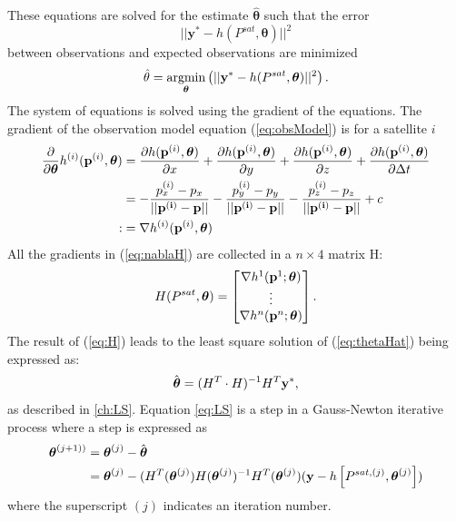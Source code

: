 These equations are solved for the estimate $\hat{\boldsymbol \theta}$ such that the error
\begin{equation}
||\textbf{y}^*-h(P^{sat},{\boldsymbol \theta})||^2
\end{equation} 
between observations and expected observations are minimized
\begin{align}\label{eq:thetaHat}
\hat{\bf \theta}=\operatorname*{argmin}_{\boldsymbol \theta}\left(||{\bf y}^*-h(P^{sat},{\boldsymbol \theta})||^2\right).
\end{align}
The system of equations is solved using the gradient of the equations. The gradient of the observation model equation (\ref{eq:obsModel}) is for a satellite $i$ 
\begin{align}
\frac{\partial}{\partial {\boldsymbol \theta}}h^{(i)}({\bf p}^{(i)},{\boldsymbol \theta})	&=
\frac{\partial h({\bf p}^{(i)},{\boldsymbol \theta})}{\partial x}+\frac{\partial h({\bf p}^{(i)},{\boldsymbol \theta})}{\partial y}+ \frac{\partial h({\bf p}^{(i)},{\boldsymbol \theta})}{\partial z}+\frac{\partial h({\bf p}^{(i)},{\boldsymbol \theta})}{\partial \Delta t} \nonumber \\
						&=-\frac{p^{(i)}_x-p_x}{||\bf p^{(i)}-p||}-\frac{p^{(i)}_y-p_y}{||\bf p^{(i)}-p||}-\frac{p^{(i)}_z-p_z}{||\bf p^{(i)}-p||}+c \nonumber \\
						:&=\nabla h^{(i)}({\bf p}^{(i)},{\boldsymbol \theta})\label{eq:nablaH}
\end{align}
All the gradients in (\ref{eq:nablaH}) are collected in a $n\times 4$ matrix H:
\begin{align}\label{eq:H}
H(P^{sat},{\boldsymbol \theta})=\begin{bmatrix}
\nabla h^1({\bf p}^{1};{\boldsymbol \theta}) \\
\vdots \\
\nabla h^n({\bf p}^{n};{\boldsymbol \theta})
\end{bmatrix}.
\end{align}
The result of (\ref{eq:H}) leads to the least square solution of (\ref{eq:thetaHat}) being expressed as:
\begin{align}\label{eq:LS}
\hat{{\boldsymbol \theta}}=(H^T\cdot H)^{-1}H^T{\bf y}^*,
\end{align}
as described in \ref{ch:LS}. Equation \ref{eq:LS} is a step in a Gauss-Newton iterative process where a step is expressed as 
\begin{align*}
{\boldsymbol \theta}^{(j+1))}	& =
{\boldsymbol \theta}^{(j)}-\hat{{\boldsymbol \theta}}\\
				& =
{\boldsymbol \theta}^{(j)}-(H^T({\boldsymbol \theta}^{(j)})H({\boldsymbol \theta}^{(j)})^{-1}H^T({\boldsymbol \theta}^{(j)})({\bf y}- h\left[P^{sat, (j)},{\boldsymbol \theta}^{(j)}\right])
\end{align*}
where the superscript $(j)$ indicates an iteration number.\\

